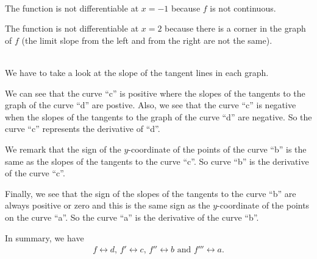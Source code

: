	\spc
	
	\\
	The function is not differentiable at $x = -1$ because $f$ is not continuous.
	
	The function is not differentiable at $x = 2$ because there is a corner in the graph of $f$ (the limit slope from the left and from the right are not the same).
	
	\spc
	
	\\
	We have to take a look at the slope of the tangent lines in each graph. 
	
	We can see that the curve ``c'' is positive where the slopes of the tangents to the graph of the curve ``d'' are postive. Also, we see that the curve ``c'' is negative when the slopes of the tangents to the graph of the curve ``d'' are negative. So the curve ``c'' represents the derivative of ``d''.
	
	We remark that the sign of the $y$-coordinate of the points of the curve ``b'' is the same as the slopes of the tangents to the curve ``c''. So curve ``b'' is the derivative of the curve ``c''. 
	
	Finally, we see that the sign of the slopes of the tangents to the curve ``b'' are always positive or zero and this is the same sign as the $y$-coordinate of the points on the curve ``a''. So the curve ``a'' is the derivative of the curve ``b''.
	
	In summary, we have
		\begin{align*}
		f \leftrightarrow d \text{, } f' \leftrightarrow c \text{, } f'' \leftrightarrow b \text{ and } f''' \leftrightarrow a .
		\end{align*}
	

